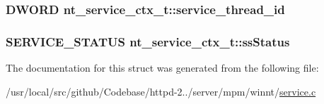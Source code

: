 \subsubsection[{\texorpdfstring{service\+\_\+thread\+\_\+id}{service_thread_id}}]{\setlength{\rightskip}{0pt plus 5cm}D\+W\+O\+RD nt\+\_\+service\+\_\+ctx\+\_\+t\+::service\+\_\+thread\+\_\+id}\hypertarget{structnt__service__ctx__t_ab481b3ab6af7abf3e39b760f618fbda0}{}\label{structnt__service__ctx__t_ab481b3ab6af7abf3e39b760f618fbda0}
\subsubsection[{\texorpdfstring{ss\+Status}{ssStatus}}]{\setlength{\rightskip}{0pt plus 5cm}S\+E\+R\+V\+I\+C\+E\+\_\+\+S\+T\+A\+T\+US nt\+\_\+service\+\_\+ctx\+\_\+t\+::ss\+Status}\hypertarget{structnt__service__ctx__t_a073bebf7ee94c8770e34da99914bbe37}{}\label{structnt__service__ctx__t_a073bebf7ee94c8770e34da99914bbe37}


The documentation for this struct was generated from the following file\+:\begin{DoxyCompactItemize}
\item 
/usr/local/src/github/\+Codebase/httpd-\/2../server/mpm/winnt/\hyperlink{service_8c}{service.\+c}\end{DoxyCompactItemize}
